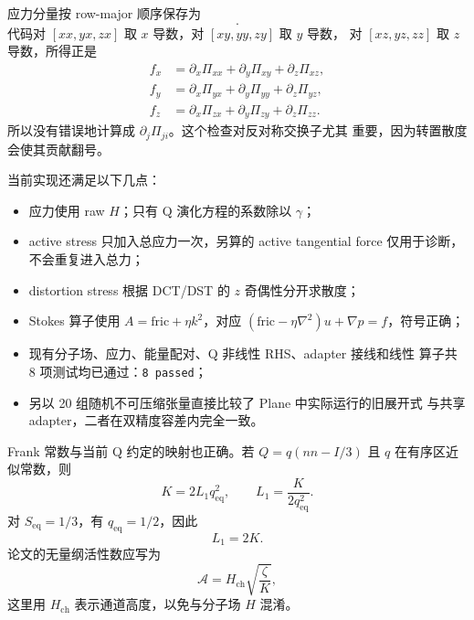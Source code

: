\documentclass[UTF8,11pt,a4paper]{ctexart}
\begin{document}
应力分量按 row-major 顺序保存为
\begin{equation}
 [xx,xy,xz,yx,yy,yz,zx,zy,zz].
\end{equation}
代码对 $[xx,yx,zx]$ 取 $x$ 导数，对 $[xy,yy,zy]$ 取 $y$ 导数，
对 $[xz,yz,zz]$ 取 $z$ 导数，所得正是
\begin{equation}
\begin{aligned}
f_x&=\partial_x\Pi_{xx}+\partial_y\Pi_{xy}+\partial_z\Pi_{xz},\\
f_y&=\partial_x\Pi_{yx}+\partial_y\Pi_{yy}+\partial_z\Pi_{yz},\\
f_z&=\partial_x\Pi_{zx}+\partial_y\Pi_{zy}+\partial_z\Pi_{zz}.
\end{aligned}
\end{equation}
所以没有错误地计算成 $\partial_j\Pi_{ji}$。这个检查对反对称交换子尤其
重要，因为转置散度会使其贡献翻号。

当前实现还满足以下几点：
\begin{itemize}
  \item 应力使用 raw $H$；只有 Q 演化方程的系数除以 $\gamma$；
  \item active stress 只加入总应力一次，另算的 active tangential force
        仅用于诊断，不会重复进入总力；
  \item distortion stress 根据 DCT/DST 的 $z$ 奇偶性分开求散度；
  \item Stokes 算子使用 $A=\mathrm{fric}+\eta k^2$，对应
        $(\mathrm{fric}-\eta\nabla^2)u+\nabla p=f$，符号正确；
  \item 现有分子场、应力、能量配对、Q 非线性 RHS、adapter 接线和线性
        算子共 8 项测试均已通过：\texttt{8 passed}；
  \item 另以 20 组随机不可压缩张量直接比较了 Plane 中实际运行的旧展开式
        与共享 adapter，二者在双精度容差内完全一致。
\end{itemize}

Frank 常数与当前 Q 约定的映射也正确。若
$Q=q(nn-I/3)$ 且 $q$ 在有序区近似常数，则
\begin{equation}
  K=2L_1q_{\mathrm{eq}}^2,
  \qquad
  L_1=\frac{K}{2q_{\mathrm{eq}}^2}.
\end{equation}
对 $S_{\mathrm{eq}}=1/3$，有 $q_{\mathrm{eq}}=1/2$，因此
\begin{equation}
  \boxed{L_1=2K.}
\end{equation}
论文的无量纲活性数应写为
\begin{equation}
  \mathcal A=H_{\mathrm{ch}}\sqrt{\frac{\zeta}{K}},
\end{equation}
这里用 $H_{\mathrm{ch}}$ 表示通道高度，以免与分子场 $H$ 混淆。
\end{document}
